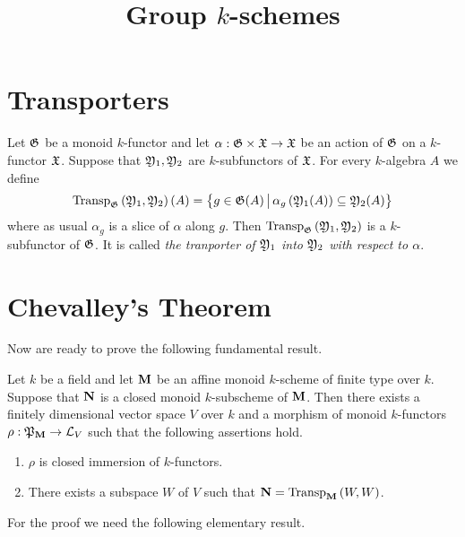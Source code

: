 


\title{Group $k$-schemes}
\date{}
\maketitle

\section{Transporters}

\begin{definition}
Let ${\mathfrak G}$ be a monoid $k$-functor and let $\alpha:{\mathfrak G}\times {\mathfrak X}\rightarrow {\mathfrak X}$ be an action of ${\mathfrak G}$ on a $k$-functor ${\mathfrak X}$. Suppose that ${\mathfrak Y}_1,{\mathfrak Y}_2$ are $k$-subfunctors of ${\mathfrak X}$. For every $k$-algebra $A$ we define
$$\mathrm{Transp}_{{\mathfrak G}}\left({\mathfrak Y}_1,{\mathfrak Y}_2\right)(A) = \big\{g\in {\mathfrak G}(A)\,\big|\,\alpha_g\left({\mathfrak Y}_1(A)\right)\subseteq {\mathfrak Y}_2(A)\big\}$$
where as usual $\alpha_g$ is a slice of $\alpha$ along $g$. Then $\mathrm{Transp}_{{\mathfrak G}}\left({\mathfrak Y}_1,{\mathfrak Y}_2\right)$ is a $k$-subfunctor of ${\mathfrak G}$. It is called \textit{the tranporter of ${\mathfrak Y}_1$ into ${\mathfrak Y}_2$ with respect to $\alpha$}. 
\end{definition}

\section{Chevalley's Theorem}




Now are ready to prove the following fundamental result.

\begin{theorem}\label{theorem:chevalley's_theorem}
Let $k$ be a field and let $\mathbf{M}$ be an affine monoid $k$-scheme of finite type over $k$. Suppose that $\mathbf{N}$ is a closed monoid $k$-subscheme of $\mathbf{M}$. Then there exists a finitely dimensional vector space $V$ over $k$ and a morphism of monoid $k$-functors $\rho:{\mathfrak P}_{\mathbf{M}}\rightarrow {\mathcal L}_V$ such that the following assertions hold.
\begin{enumerate}[label=\textbf{\emph{(\arabic*)}}, leftmargin=1.5em]
\item $\rho$ is closed immersion of $k$-functors.
\item There exists a subspace $W$ of $V$ such that $\mathbf{N} = \mathrm{Transp}_{\mathbf{M}}\left(W,W\right)$.
\end{enumerate}
\end{theorem}
For the proof we need the following elementary result.

